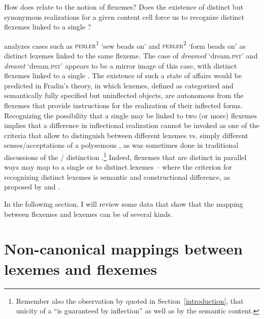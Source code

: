 \documentclass[output=paper]{langsci/langscibook}
\begin{document}
How does  relate to the notion of flexemes? Does the
existence of distinct but synonymous realizations for a given content
cell force us to recognize distinct flexemes linked to a single ?

\citet{Fradin17} %
%
 analyzes cases such as
\textsc{perler\textsuperscript{1}} `sew beads on' and
\textsc{perler\textsuperscript{2}} `form beads on' as distinct lexemes
linked to the same flexeme. The case of \emph{dreamed}
`dream.\textsc{pst'} and \emph{dreamt} `dream.\textsc{pst'} appears to
be a mirror image of this case, with distinct flexemes linked to a
single . The existence of such a state of affairs would be
predicted in Fradin's theory, in which lexemes, defined as categorized
and semantically fully specified but uninflected objects, are autonomous
from the flexemes that provide instructions for the realization of their
inflected forms. Recognizing the possibility that a single  may be
linked to two (or more) flexemes implies that a difference in
inflectional realization cannot be invoked as one of the criteria that
allow to distinguish between different lexemes vs. simply different
senses\slash{}acceptations of a polysemous , as was sometimes done in
traditional discussions of the \slash{} distinction %
\citep[see e.g.][127--132]{Ullmann1957}%
%
.\footnote{Remember also the observation by %
\citet[177]{Fradin03b} %
%
quoted in Section~\ref{introduction}, that unicity of a  ``is
  guaranteed by inflection'' as well as by the semantic content.}
Indeed, flexemes that are distinct in parallel ways may map to a single
 or to distinct lexemes -- where the criterion for recognizing
distinct lexemes is semantic and constructional difference, as proposed
by %
\citet{Fradin03b,Fradin09} %
%
and %
\citet{Fradin2003,Fradin17}%
%
.

In the following section, I will review some data that show that the
mapping between flexemes and lexemes can be of several kinds.

\section{Non-canonical mappings between lexemes and
flexemes}\label{non-canonical-mappings-between-lexemes-and-flexemes}
\end{document}
